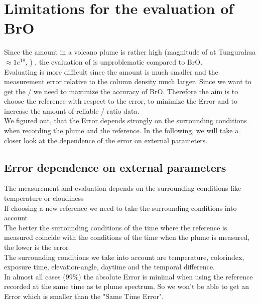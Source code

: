 \documentclass  [
  paper    = a4,
  BCOR     = 10mm,
  twoside,
  fontsize = 12pt,
  fleqn,
  toc      = bibnumbered,
  toc      = listofnumbered,
  numbers  = noendperiod,
  headings = normal,
  listof   = leveldown,
  version  = 3.03
]                                       {scrreprt}
\begin{document}
	\begin{figure}
		\centering
		\caption{}
		\label{fig:contaminationdependencyso2}
	\end{figure}
	\begin{figure}
		\centering
		\caption{}
		\label{fig:contaminationdependencybro}
	\end{figure}
	\begin{figure}
		\centering
		\caption{}
		\label{fig:contaminationdependencyratio}
	\end{figure}
	\chapter{Limitations for the evaluation of  BrO}
    Since the  amount in a volcano plume is rather high (magnitude of  at Tungurahua $\approx 1e^{18}$, \cite{WarnachSimon}) , the evaluation of  is unproblematic compared to BrO.\\
	Evaluating  is more difficult since the amount is much smaller and the measurement error relative to the column density much larger. Since we want to get the / we need to maximize the accuracy of BrO.
	Therefore the aim is to choose the reference with respect to the  error, to minimize the  Error and to increase the amount of reliable / ratio data.\\
	We figured out, that the  Error depends strongly on the surrounding conditions when recording the plume and the reference. In the following, we will take a closer look at the dependence of the  error on external parameters. 
	\section{ Error dependence on external parameters \label{Chap:BROErr}}
	The measurement and evaluation depends on the surrounding conditions like temperature or cloudiness \cite{lubcke2014optical}\\
	If choosing a new reference we need to take the surrounding conditions into account\\
	The better the surrounding conditions of the time where the reference is measured coincide with the conditions of the time when the plume is measured, the lower is the  error \\
	The surrounding conditions we take into account are temperature, colorindex, exposure time, elevation-angle, daytime and the temporal difference.\\
	In almost all cases (99\%) the absolute  Error is minimal when using the reference recorded at the same time as te plume spectrum. So we won't be able to get an  Error which is smaller than the "Same Time Error".   
\end{document}
